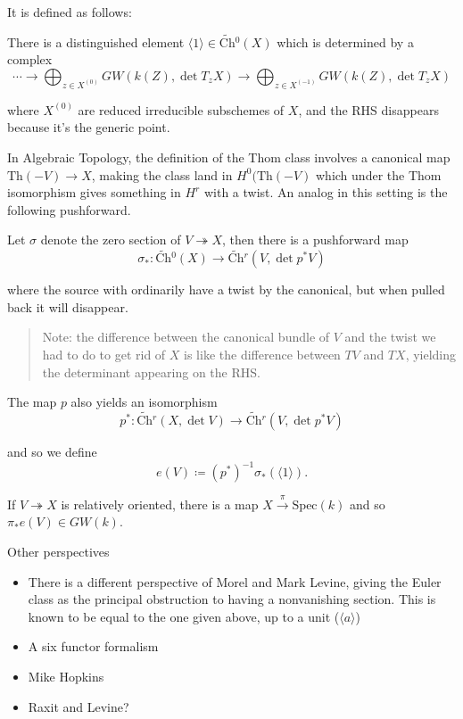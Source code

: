 \documentclass[11pt]{scrreprt}
\theoremstyle{definition}
\providecommand{\tightlist}{%
  \setlength{\itemsep}{0pt}\setlength{\parskip}{0pt}}
\newcommand{\spec}[0]{{\mathrm{Spec}}}
\newcommand{\mapsvia}[1]{\xrightarrow{#1}}
\newcommand{\generators}[1]{\langle{#1}\rangle}
\newcommand{\covers}[0]{\twoheadrightarrow}
\newcommand{\definedas}[0]{\coloneqq}
\newcommand{\surjects}[0]{\twoheadrightarrow}
\begin{document}
It is defined as follows:

There is a distinguished element
\(\generators{1}\in \widetilde{\text{Ch}}{}^0(X)\) which is determined
by a complex \[
\cdots \to \bigoplus_{z\in X^{(0)}} GW(k(Z), \det T_zX) \to \bigoplus_{z\in X^{(-1)}} GW(k(Z), \det T_zX)
\]

where \(X^{(0)}\) are reduced irreducible subschemes of \(X\), and the
RHS disappears because it's the generic point.

In Algebraic Topology, the definition of the Thom class involves a
canonical map \(\text{Th}(-V)\to X\), making the class land in
\(H^0(\text{Th}(-V)\) which under the Thom isomorphism gives something
in \(H^r\) with a twist. An analog in this setting is the following
pushforward.

Let \(\sigma\) denote the zero section of \(V\covers X\), then there is
a pushforward map \[
\sigma_*: \widetilde{\text{Ch}}{}^0(X) \to \widetilde{\text{Ch}}{}^r(V, \det p^* V)
\]

where the source with ordinarily have a twist by the canonical, but when
pulled back it will disappear.

\begin{quote}
Note: the difference between the canonical bundle of \(V\) and the twist
we had to do to get rid of \(X\) is like the difference between \(TV\)
and \(TX\), yielding the determinant appearing on the RHS.
\end{quote}

The map \(p\) also yields an isomorphism \[
p^*: \widetilde{\text{Ch}}{}^r(X, \det V) \to \widetilde{\text{Ch}}{}^r(V, \det p^* V)
\]

and so we define \[
e(V) \definedas (p^*)^{-1}\sigma_*(\generators{1}).
\]

If \(V \surjects X\) is relatively oriented, there is a map
\(X \mapsvia \pi \spec(k)\) and so \(\pi_* e(V) \in GW(k)\).

Other perspectives

\begin{itemize}
\tightlist
\item
  There is a different perspective of Morel and Mark Levine, giving the
  Euler class as the principal obstruction to having a nonvanishing
  section. This is known to be equal to the one given above, up to a
  unit (\(\generators{a}\))
\item
  A six functor formalism
\item
  Mike Hopkins
\item
  Raxit and Levine?
\end{itemize}
\end{document}
